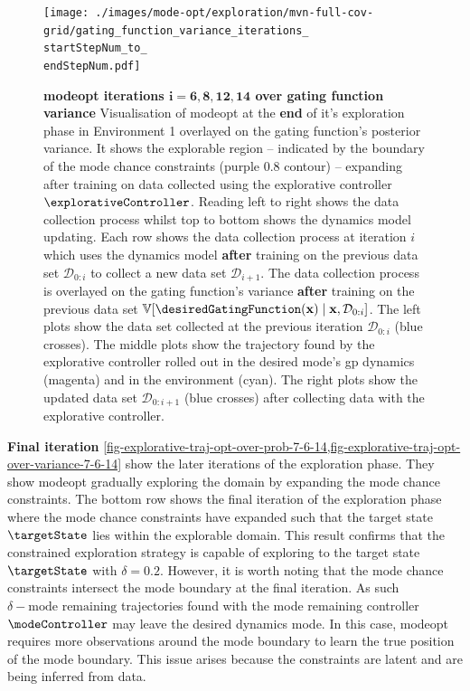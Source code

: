 \documentclass{mimosis-class/mimosis}
\numberwithin{equation}{chapter}
\newcommand{\state}{\ensuremath{\mathbf{x}}}
\newcommand{\dataset}{\ensuremath{\mathcal{D}}}
\newcommand{\modeVar}{\ensuremath{\alpha}}
\begin{document}
{\renewcommand{\startStepNum}{6}
\renewcommand{\endStepNum}{14}
\begin{figure}
\centering
\texttt{[image: ./images/mode-opt/exploration/mvn-full-cov-grid/gating\_function\_variance\_iterations\_\\startStepNum\_to\_\\endStepNum.pdf]}
\caption[\acrshort{modeopt} iterations $\mathbf{i=6, 8, 12, 14}$ over gating function variance]{\textbf{\acrshort{modeopt} iterations $\mathbf{i=6, 8, 12, 14}$ over gating function variance}
Visualisation of \acrshort{modeopt} at the \textbf{end} of it's exploration phase in Environment 1 overlayed
on the gating function's posterior variance.
It shows the explorable region -- indicated by the boundary of the mode chance constraints (purple 0.8 contour)
-- expanding after training on data collected using the explorative controller $\explorativeController$.
Reading left to right shows the data collection process whilst top to bottom shows the dynamics model updating.
Each row shows the data collection process at iteration $i$ which uses the dynamics model
\textbf{after} training on the previous data set $\mathcal{D}_{0:i}$ to collect a new data set $\dataset_{i+1}$.
The data collection process is overlayed on the gating function's variance \textbf{after} training on the previous
data set $\mathbb{V}[\desiredGatingFunction(\state) \mid \state, \dataset_{0:i}]$.
The left plots show the data set collected at the previous iteration $\dataset_{0:i}$ (blue crosses).
The middle plots show the trajectory found by the explorative controller rolled out in the desired mode's \acrshort{gp}
dynamics (magenta) and in the environment (cyan).
The right plots show the updated data set $\dataset_{0:i+1}$ (blue crosses) after collecting data with the explorative
controller.}
\label{fig-explorative-traj-opt-over-variance-7-\startStepNum-\endStepNum}
\end{figure}

\newline

\textbf{Final iteration}
\cref{fig-explorative-traj-opt-over-prob-7-6-14,fig-explorative-traj-opt-over-variance-7-6-14}
show the later iterations of the exploration phase.
They show \acrshort{modeopt} gradually exploring the domain by expanding the mode chance constraints.
The bottom row shows the final iteration of the exploration phase where the
mode chance constraints have expanded such that the target state \(\targetState\) lies within the explorable domain.
This result confirms that the constrained exploration strategy is capable of exploring to the target state \(\targetState\)
with \(\delta=0.2\).
However, it is worth noting that the mode chance constraints intersect the mode boundary at the final iteration.
As such \(\delta-\text{mode remaining}\) trajectories found with the mode remaining controller \(\modeController\)
may leave the desired dynamics mode.
In this case, \acrshort{modeopt} requires more observations around the mode boundary to learn the true position
of the mode boundary.
This issue arises because the constraints are latent and are being inferred from data.

}
\end{document}
